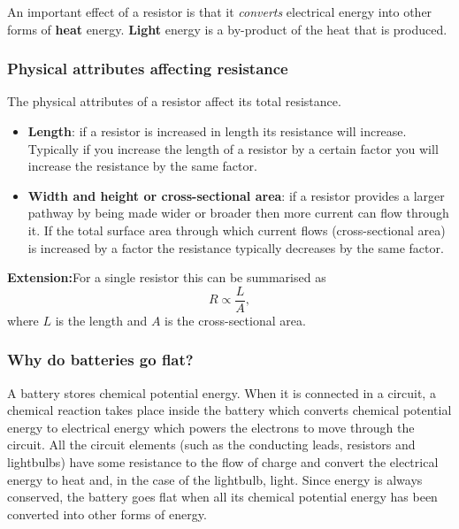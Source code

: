 An important effect of a resistor is that it \textit{converts} electrical
energy into other forms of \textbf{heat} energy. \textbf{Light} energy is a by-product of the heat that is produced.


\subsubsection{Physical attributes affecting resistance}

The physical attributes of a resistor affect its total resistance.
\begin{itemize}
 \item \textbf{Length}: if a resistor is increased in length its resistance will increase. Typically if you increase the length of a resistor by a certain factor you will increase the resistance by the same factor.
\item \textbf{Width and height or cross-sectional area}: if a resistor provides a larger pathway by being made wider or broader then more current can flow through it. If the total surface area through which current flows (cross-sectional area) is increased by a factor the resistance typically decreases by the same factor. 
\end{itemize}
\textbf{Extension:}For a single resistor this can be summarised as
\begin{equation*}
 R\propto\frac{L}{A},
\end{equation*} where $L$ is the length and $A$ is the cross-sectional area.

\subsubsection*{Why do batteries go flat?}
A battery stores chemical potential energy. When it is connected in a circuit, a chemical reaction takes place inside the battery which converts chemical potential energy to electrical energy which powers the electrons to move through the circuit. All the circuit elements (such as the conducting leads, resistors and lightbulbs) have some resistance to the flow of charge and convert the electrical energy to heat and, in the case of the lightbulb, light.
Since energy is always conserved, the battery goes flat when all its chemical potential energy has been converted into other forms of energy.

